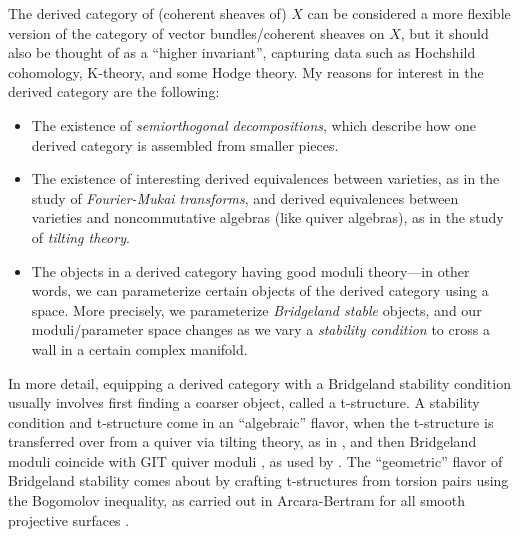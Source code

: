 \documentclass[12pt]{article}
\begin{document}
The derived category of (coherent sheaves of) $X$ can be considered a more flexible version of the category of vector bundles/coherent sheaves on $X$, but it should also be thought of as a ``higher invariant''\cite{Keller_2007}, capturing data such as Hochshild cohomology, K-theory, and some Hodge theory. My reasons for interest in the derived category are the following:
\begin{itemize}
    \item The existence of \textit{semiorthogonal decompositions}, which describe how one derived category is assembled from smaller pieces.
    \item The existence of interesting derived equivalences between varieties, as in the study of \textit{Fourier-Mukai transforms}, and derived equivalences between varieties and noncommutative algebras (like quiver algebras), as in the study of \textit{tilting theory}.
    \item The objects in a derived category having good moduli theory---in other words, we can parameterize certain objects of the derived category using a space. More precisely, we parameterize \textit{Bridgeland stable} objects, and our moduli/parameter space changes as we vary a \textit{stability condition} to cross a wall in a certain complex manifold.
\end{itemize}


In more detail, equipping a derived category with a Bridgeland stability condition usually involves first finding a coarser object, called a t-structure. A stability condition and t-structure come in an ``algebraic'' flavor, when the t-structure is transferred over from a quiver via tilting theory, as in \cite{Craw,King}, and then Bridgeland moduli coincide with GIT quiver moduli \cite{King_1994}, as used by \cite{Arcara_Bertram_Coskun_Huizenga_2012}. The ``geometric'' flavor of Bridgeland stability comes about by crafting t-structures from torsion pairs using the Bogomolov inequality, as carried out in Arcara-Bertram for all smooth projective surfaces \cite{Arcara_Bertram_Lieblich_2007}.
\end{document}
